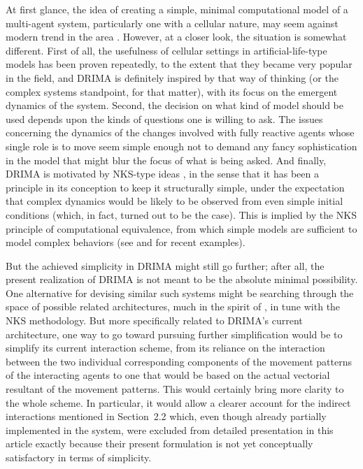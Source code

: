 \documentclass[11pt, a4paper]{article}
\begin{document}
At first glance, the idea of creating a simple, minimal computational model of a multi-agent system, particularly one with a cellular nature, may seem against modern trend in the area \cite{ref8}. However, at a closer look, the situation is somewhat different. First of all, the usefulness of cellular settings in artificial-life-type models has been proven repeatedly, to the extent that they became very popular in the field, and DRIMA is definitely inspired by that way of thinking (or the complex systems standpoint, for that matter), with its focus on the emergent dynamics of the system. Second, the decision on what kind of model should be used depends upon the kinds of questions one is willing to ask. The issues concerning the dynamics of the changes involved with fully reactive agents whose single role is to move seem simple enough not to demand any fancy sophistication in the model that might blur the focus of what is being asked. And finally, DRIMA is motivated by NKS-type ideas \cite{ref9}, in the sense that it has been a principle in its conception to keep it structurally simple, under the expectation that complex dynamics would be likely to be observed from even simple initial conditions (which, in fact, turned out to be the case). This is implied by the NKS principle of computational equivalence, from which simple models are sufficient to model complex behaviors (see \cite{ref10} and \cite{ref11} for recent examples).

But the achieved simplicity in DRIMA might still go further; after all, the present realization of DRIMA is not meant to be the absolute minimal possibility. One alternative for devising similar such systems might be searching through the space of possible related architectures, much in the spirit of \cite{ref12}, in tune with the NKS methodology. But more specifically related to DRIMA's current architecture, one way to go toward pursuing further simplification would be to simplify its current interaction scheme, from its reliance on the interaction between the two individual corresponding components of the movement patterns of the interacting agents to one that would be based on the actual vectorial resultant of the movement patterns. This would certainly bring more clarity to the whole scheme. In particular, it would allow a clearer account for the indirect interactions mentioned in Section~2.2 which, even though already partially implemented in the system, were excluded from detailed presentation in this article exactly because their present formulation is not yet conceptually satisfactory in terms of simplicity.
\end{document}
